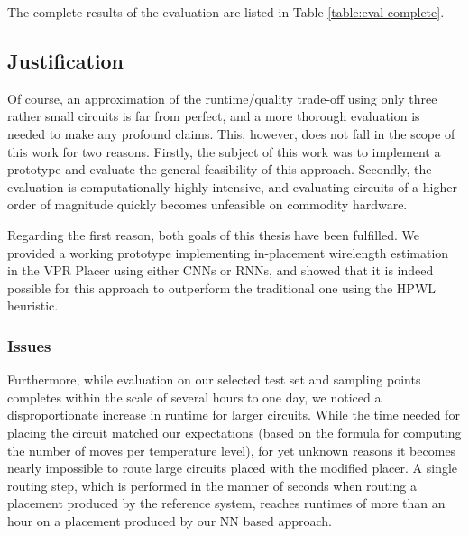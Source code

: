 The complete results of the evaluation are listed in Table \ref{table:eval-complete}.

\subsection{Justification}\label{ch:Justification}

Of course, an approximation of the runtime/quality trade-off using only three rather small circuits is far from perfect, and a more thorough evaluation is needed to make any profound claims. This, however, does not fall in the scope of this work for two reasons. Firstly, the subject of this work was to implement a prototype and evaluate the general feasibility of this approach. Secondly, the evaluation is computationally highly intensive, and evaluating circuits of a higher order of magnitude quickly becomes unfeasible on commodity hardware.

Regarding the first reason, both goals of this thesis have been fulfilled. We provided a working prototype implementing in-placement wirelength estimation in the \gls{VPR} Placer using either \glspl{CNN} or \glspl{RNN}, and showed that it is indeed possible for this approach to outperform the traditional one using the \gls{HPWL} heuristic.

\subsubsection{Issues}

Furthermore, while evaluation on our selected test set and sampling points completes within the scale of several hours to one day, we noticed a disproportionate increase in runtime for larger circuits. While the time needed for placing the circuit matched our expectations (based on the formula for computing the number of moves per temperature level), for yet unknown reasons it becomes nearly impossible to route large circuits placed with the modified placer. A single routing step, which is performed in the manner of seconds when routing a placement produced by the reference system, reaches runtimes of more than an hour on a placement produced by our \gls{NN} based approach. 

